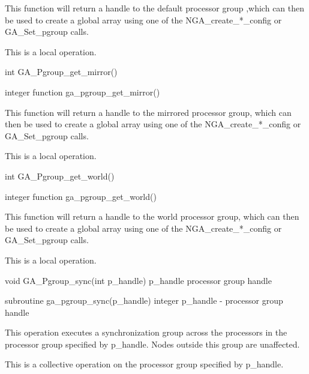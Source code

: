 \documentclass[12pt]{article}
\begin{document}
\begin{desc}

This function will return a handle to the default processor group ,which can then be used to create a global array using one of the NGA_create_*_config or GA_Set_pgroup calls.

This is a local operation. 
\end{desc}


\begin{capi}
int GA_Pgroup_get_mirror()
\end{capi}
\begin{fapi}
integer function ga_pgroup_get_mirror()
\end{fapi}

\begin{desc}

This function will return a handle to the mirrored processor group, which can then be used to create a global array using one of the NGA_create_*_config or GA_Set_pgroup calls.

This is a local operation. 
\end{desc}


\begin{capi}
int GA_Pgroup_get_world()
\end{capi}
\begin{fapi}
integer function ga_pgroup_get_world()
\end{fapi}

\begin{desc}

This function will return a handle to the world processor group, which can then be used to create a global array using one of the NGA_create_*_config or GA_Set_pgroup calls.

This is a local operation.
\end{desc}


\begin{capi}
void GA_Pgroup_sync(int p_handle)
   p_handle                  processor group handle  \access{[input]} 
\end{capi}
\begin{fapi}
subroutine ga_pgroup_sync(p_handle)
   integer         p_handle     - processor group handle  \access{[input]} 
\end{fapi}

\begin{desc}

This operation executes a synchronization group across the processors in the processor group specified by p_handle. Nodes outside this group are unaffected.

This is a collective operation on the processor group specified by p_handle. 
\end{desc}
\end{document}
